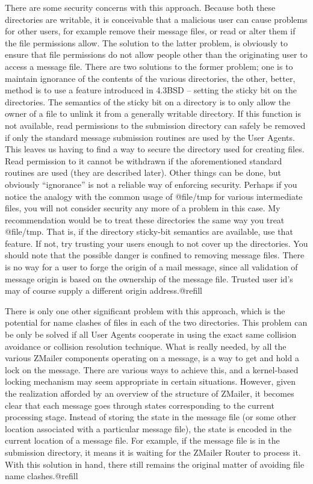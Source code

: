 There are some security concerns with this approach.  Because both
these directories are writable, it is conceivable that a malicious user
can cause problems for other users, for example remove their message
files, or read or alter them if the file permissions allow.  The
solution to the latter problem, is obviously to ensure that file
permissions do not allow people other than the originating user to
access a message file.  There are two solutions to the former problem;
one is to maintain ignorance of the contents of the various
directories, the other, better, method is to use a feature introduced
in 4.3BSD -- setting the sticky bit on the directories.  The semantics
of the sticky bit on a directory is to only allow the owner of a file
to unlink it from a generally writable directory.  If this function is
not available, read permissions to the submission directory can safely
be removed if only the standard message submission routines are used by
the User Agents.  This leaves us having to find a way to secure the
directory used for creating files.  Read permission to it cannot be
withdrawn if the aforementioned standard routines are used (they are
described later).  Other things can be done, but obviously
``ignorance'' is not a reliable way of enforcing security.  Perhaps if
you notice the analogy with the common usage of @file{/tmp} for various
intermediate files, you will not consider security any more of a
problem in this case.  My recommendation would be to treat these
directories the same way you treat @file{/tmp}.  That is, if the
directory sticky-bit semantics are available, use that feature.  If
not, try trusting your users enough to not cover up the directories.
You should note that the possible danger is confined to removing
message files.  There is no way for a user to forge the origin of a
mail message, since all validation of message origin is based on the
ownership of the message file.  Trusted user id's may of course supply
a different origin address.@refill

There is only one other significant problem with this approach, which
is the potential for name clashes of files in each of the two
directories.  This problem can be only be solved if all User Agents
cooperate in using the exact same collision avoidance or collision
resolution technique.  What is really needed, by all the
various ZMailer components operating on a message, is a way to get and
hold a lock on the message.  There are various ways to achieve this,
and a kernel-based locking mechanism may seem appropriate in certain
situations.  However, given the realization afforded by an overview of
the structure of ZMailer, it becomes clear that each message goes
through states corresponding to the current processing stage.  Instead
of storing the state in the message file (or some other location
associated with a particular message file), the state is encoded in
the current location of a message file.  For example, if the message
file is in the submission directory, it means it is waiting for the
ZMailer Router to process it.  With this solution in hand, there still
remains the original matter of avoiding file name clashes.@refill

